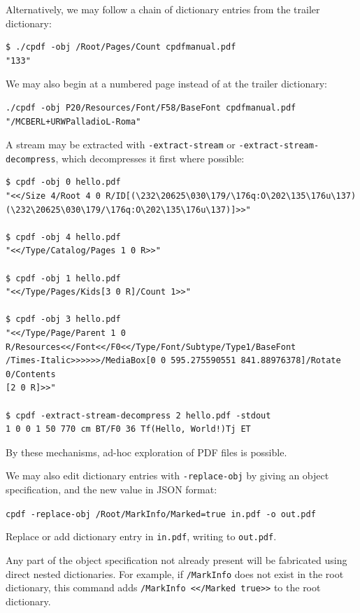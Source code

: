 \documentclass{book}
\begin{document}
\noindent Alternatively, we may follow a chain of dictionary entries from the trailer dictionary:

{\small\begin{verbatim}
$ ./cpdf -obj /Root/Pages/Count cpdfmanual.pdf
"133"
\end{verbatim}}

\noindent We may also begin at a numbered page instead of at the trailer dictionary:

{\small\begin{verbatim}
./cpdf -obj P20/Resources/Font/F58/BaseFont cpdfmanual.pdf
"/MCBERL+URWPalladioL-Roma"
\end{verbatim}}

\noindent A stream may be extracted with \texttt{-extract-stream} or \texttt{-extract-stream-decompress}, which decompresses it first where possible:

{\small\begin{verbatim}
$ cpdf -obj 0 hello.pdf
"<</Size 4/Root 4 0 R/ID[(\232\20625\030\179/\176q:O\202\135\176u\137)
(\232\20625\030\179/\176q:O\202\135\176u\137)]>>"

$ cpdf -obj 4 hello.pdf
"<</Type/Catalog/Pages 1 0 R>>"

$ cpdf -obj 1 hello.pdf
"<</Type/Pages/Kids[3 0 R]/Count 1>>"

$ cpdf -obj 3 hello.pdf
"<</Type/Page/Parent 1 0 R/Resources<</Font<</F0<</Type/Font/Subtype/Type1/BaseFont
/Times-Italic>>>>>>/MediaBox[0 0 595.275590551 841.88976378]/Rotate 0/Contents
[2 0 R]>>"

$ cpdf -extract-stream-decompress 2 hello.pdf -stdout
1 0 0 1 50 770 cm BT/F0 36 Tf(Hello, World!)Tj ET
\end{verbatim}}

\noindent By these mechanisms, ad-hoc exploration of PDF files is possible.

We may also edit dictionary entries with \texttt{-replace-obj} by giving an object specification, and the new value in JSON format:

  \begin{framed}
  \small\noindent\verb!cpdf -replace-obj /Root/MarkInfo/Marked=true in.pdf -o out.pdf!

  \vspace{2.5mm}
  \noindent Replace or add dictionary entry in \texttt{in.pdf}, writing to \texttt{out.pdf}. 
  \end{framed}

\noindent Any part of the object specification not already present will be fabricated using direct nested dictionaries. For example, if \texttt{/MarkInfo} does not exist in the root dictionary, this command adds \texttt{/MarkInfo <</Marked true>>} to the root dictionary.
\end{document}
